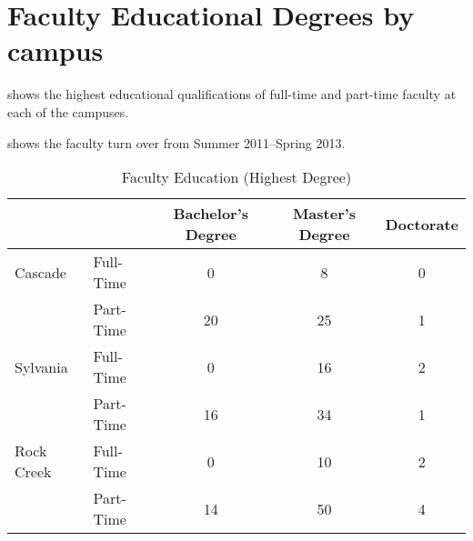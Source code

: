 \chapter{Faculty Educational Degrees by campus}\label{app:sec:facultyDegrees}

 shows the highest educational 
qualifications of full-time and part-time faculty at each of the campuses.

 shows the faculty turn over from 
Summer 2011--Spring 2013.

\begin{table}[!htb]
	\centering
	\caption{Faculty Education (Highest Degree)}
	\label{app:tab:facultyDegrees}
	\begin{tabular}{ll*{3}{S}}
		\toprule
		 & & {Bachelor's Degree} & {Master's Degree} & {Doctorate} \\
		\midrule
		Cascade    & Full-Time & 0  & 8  & 0 \\
		           & Part-Time & 20 & 25 & 1 \\
		Sylvania   & Full-Time & 0  & 16 & 2 \\
		           & Part-Time & 16 & 34 & 1 \\
		Rock Creek & Full-Time & 0  & 10 & 2 \\
		           & Part-Time & 14 & 50 & 4 \\
		\bottomrule
	\end{tabular}
\end{table}


